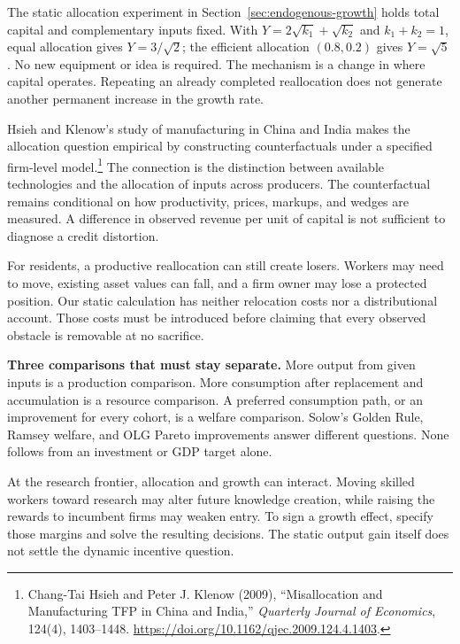 The static allocation experiment in Section~\ref{sec:endogenous-growth}
holds total capital and complementary inputs fixed. With
$Y=2\sqrt{k_1}+\sqrt{k_2}$ and $k_1+k_2=1$, equal allocation gives
$Y=3/\sqrt{2}$; the efficient allocation $(0.8,0.2)$ gives $Y=\sqrt{5}$.
No new equipment or idea is required. The mechanism is a change in where
capital operates. Repeating an already completed reallocation does not
generate another permanent increase in the growth rate.

Hsieh and Klenow's study of manufacturing in China and India makes the
allocation question empirical by constructing counterfactuals under a
specified firm-level model.\footnote{Chang-Tai Hsieh and Peter J. Klenow
(2009), ``Misallocation and Manufacturing TFP in China and India,''
\textit{Quarterly Journal of Economics}, 124(4), 1403--1448.
\url{https://doi.org/10.1162/qjec.2009.124.4.1403}.}
The connection is the distinction between available technologies and the
allocation of inputs across producers. The counterfactual remains conditional
on how productivity, prices, markups, and wedges are measured. A difference
in observed revenue per unit of capital is not sufficient to diagnose a
credit distortion.

For residents, a productive reallocation can still create losers. Workers
may need to move, existing asset values can fall, and a firm owner may lose
a protected position. Our static calculation has neither relocation costs
nor a distributional account. Those costs must be introduced before claiming
that every observed obstacle is removable at no sacrifice.

\begin{blueblock}
\textbf{Three comparisons that must stay separate.}
More output from given inputs is a production comparison. More consumption
after replacement and accumulation is a resource comparison. A preferred
consumption path, or an improvement for every cohort, is a welfare comparison.
Solow's Golden Rule, Ramsey welfare, and OLG Pareto improvements answer
different questions. None follows from an investment or GDP target alone.
\end{blueblock}

At the research frontier, allocation and growth can interact. Moving skilled
workers toward research may alter future knowledge creation, while raising
the rewards to incumbent firms may weaken entry. To sign a growth effect,
specify those margins and solve the resulting decisions. The static output
gain itself does not settle the dynamic incentive question.

